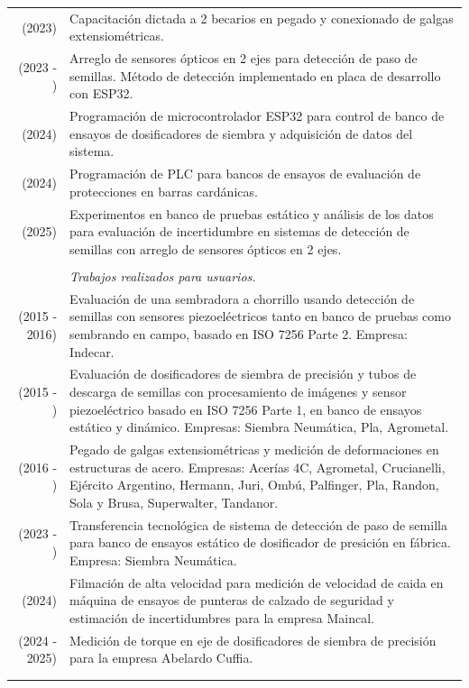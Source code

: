 \documentclass[a4paper,10pt, sans]{article}
\begin{document}
  \begin{table}[H]
  \centering
  \begin{tabularx}{\textwidth}{r X}
        (2023) & Capacitación dictada a 2 becarios en pegado y conexionado de galgas extensiométricas. \\ [1ex]
        (2023 - ) & Arreglo de sensores ópticos en 2 ejes para detección de paso de semillas. Método de detección implementado en placa de desarrollo con ESP32. \\ [1ex]
        (2024) & Programación de microcontrolador ESP32 para control de banco de ensayos de
dosificadores de siembra y adquisición de datos del sistema. \\ [1ex]
        (2024) & Programación de PLC para bancos de ensayos de evaluación de protecciones en barras cardánicas.\\ [1ex]
        (2025) & Experimentos en banco de pruebas estático y análisis de los datos para evaluación de incertidumbre en sistemas de detección de semillas con arreglo de sensores ópticos en 2 ejes.\\ \\
        
        
        
        
        {} & \hspace{2cm} \textit{Trabajos realizados para usuarios.} \\ [1ex]
        (2015 - 2016) & Evaluación de una sembradora a chorrillo usando detección de semillas con sensores piezoeléctricos tanto en banco de pruebas como sembrando en campo, basado en ISO 7256 Parte 2. Empresa: Indecar. \\  [1ex]

        (2015 - ) & Evaluación de dosificadores de siembra de precisión y tubos de descarga de semillas con procesamiento de imágenes y sensor piezoeléctrico basado en ISO 7256 Parte 1, en banco de ensayos estático y dinámico. Empresas: Siembra Neumática, Pla, Agrometal. \\ [1ex]
        (2016 - ) & Pegado de galgas extensiométricas y medición de deformaciones en estructuras de acero. Empresas: Acerías 4C, Agrometal, Crucianelli, Ejército Argentino, Hermann, Juri, Ombú, Palfinger, Pla, Randon, Sola y Brusa, Superwalter, Tandanor. \\ [1ex]
        (2023 - ) & Transferencia tecnológica de sistema de detección de paso de semilla para banco de ensayos estático de dosificador de presición en fábrica. Empresa: Siembra Neumática. \\ [1ex]
        (2024)&  Filmación de alta velocidad para medición de velocidad de caida en máquina de ensayos de punteras de calzado de seguridad y estimación de incertidumbres para la empresa Maincal. \\ [1ex]
        (2024 - 2025) & Medición de torque en eje de dosificadores de siembra de precisión para la empresa
Abelardo Cuffia. \\ \\ \hline \\


\end{tabularx}
\end{table}
\end{document}
